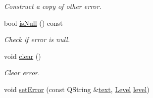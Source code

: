 \begin{DoxyCompactItemize}
\begin{DoxyCompactList}\small\item\em Construct a copy of other error. \end{DoxyCompactList}\item 
bool \hyperlink{class_mdt_1_1_error_a2b6a7708216d0de056c7d9e7dc571e70}{is\+Null} () const 
\begin{DoxyCompactList}\small\item\em Check if error is null. \end{DoxyCompactList}\item 
void \hyperlink{class_mdt_1_1_error_a77014ce33160e1f01b3fbb3e55f19783}{clear} ()
\begin{DoxyCompactList}\small\item\em Clear error. \end{DoxyCompactList}\item 
void \hyperlink{class_mdt_1_1_error_a895930ac30664f54a7f22ae593db53a0}{set\+Error} (const Q\+String \&\hyperlink{class_mdt_1_1_error_a99327678615e8f2bddd22cd59482bfc2}{text}, \hyperlink{class_mdt_1_1_error_ab533dc690f68a8635232db594194a068}{Level} \hyperlink{class_mdt_1_1_error_a9c73117a49791ab87163b815d6a3e0c9}{level})\hypertarget{class_mdt_1_1_error_a895930ac30664f54a7f22ae593db53a0}{}\label{class_mdt_1_1_error_a895930ac30664f54a7f22ae593db53a0}


\end{DoxyCompactItemize}
